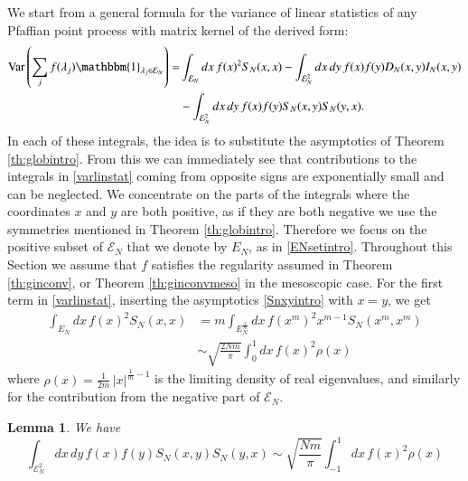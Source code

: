 \documentclass[11pt,reqno]{amsproc}
\newtheorem{lemma}[theorem]{Lemma}
\numberwithin{equation}{section}
\numberwithin{theorem}{section}
\begin{document}
We start from a general formula for the variance of linear statistics of any Pfaffian point process with matrix kernel of the derived form:
\begin{equation}
\begin{split}
\mathrm{Var}\left(\sum_{j}f(\lambda_j)\mathbbm{1}_{\lambda_{j} \in \mathcal{E}_{N}}\right) =& \int_{\mathcal{E}_{N}}dx\,f(x)^{2}S_{N}(x,x)-\int_{\mathcal{E}_{N}^{2}}dx\,dy\,f(x)f(y)D_{N}(x,y)I_{N}(x,y)\\
&- \int_{\mathcal{E}_{N}^{2}}dx\,dy\,f(x)f(y)S_{N}(x,y)S_{N}(y,x). \label{varlinstat}
\end{split}
\end{equation}
In each of these integrals, the idea is to substitute the asymptotics of Theorem \ref{th:globintro}. From this we can immediately see that contributions to the integrals in \eqref{varlinstat} coming from opposite signs are exponentially small and can be neglected. We concentrate on the parts of the integrals where the coordinates $x$ and $y$ are both positive, as if they are both negative we use the symmetries mentioned in Theorem \ref{th:globintro}. Therefore we focus on the positive subset of $\mathcal{E}_{N}$ that we denote by $E_{N}$, as in \eqref{ENsetintro}. Throughout this Section we assume that $f$ satisfies the regularity assumed in Theorem \ref{th:ginconv}, or Theorem \ref{th:ginconvmeso} in the mesoscopic case.
For the first term in \eqref{varlinstat}, inserting the asymptotics \eqref{Snxyintro} with $x=y$, we get 
\begin{align}
\int_{E_N}dx\,f(x)^{2}S_{N}(x,x) &= m\int_{E_{N}^{\frac{1}{m}}}dx\, f(x^{m})^{2}x^{m-1}S_{N}(x^{m},x^{m}) \\
&\sim \sqrt{\frac{2Nm}{\pi}}\int_{0}^{1}dx\,f(x)^{2}\rho(x) \label{vardiag}
\end{align}
where $\rho(x) = \frac{1}{2m}\,|x|^{\frac{1}{m}-1}$ is the limiting density of real eigenvalues, and similarly for the contribution from the negative part of $\mathcal{E}_{N}$.
\begin{lemma}
\label{lem:snsnvar}
We have
\begin{equation}
\int_{\mathcal{E}_{N}^{2}}dx\,dy\,f(x)f(y)S_{N}(x,y)S_{N}(y,x) \sim \sqrt{\frac{Nm}{\pi}}\int_{-1}^{1}dx\,f(x)^{2}\rho(x) \label{snsnlim}
\end{equation}
\end{lemma}
\end{document}
